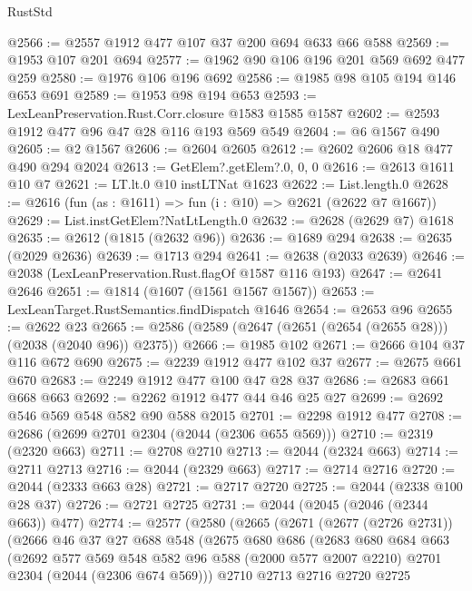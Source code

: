 \begin{lexlean}{RustStd}
\begin{coremodule}
{\begin{coremodule}
{{{{{{{{{{{{{{@2566 := @2557 @1912 @477 @107 @37 @200 @694 @633 @66 @588
@2569 := @1953 @107 @201 @694
@2577 := @1962 @90 @106 @196 @201 @569 @692 @477 @259
@2580 := @1976 @106 @196 @692
@2586 := @1985 @98 @105 @194 @146 @653 @691
@2589 := @1953 @98 @194 @653
@2593 := LexLeanPreservation.Rust.Corr.closure @1583 @1585 @1587
@2602 := @2593 @1912 @477 @96 @47 @28 @116 @193 @569 @549
@2604 := @6 @1567 @490
@2605 := @2 @1567
@2606 := @2604 @2605
@2612 := @2602 @2606 @18 @477 @490 @294 @2024
@2613 := GetElem?.getElem?.{0, 0, 0}
@2616 := @2613 @1611 @10 @7
@2621 := LT.lt.{0} @10 instLTNat @1623
@2622 := List.length.{0}
@2628 := @2616 (fun (as : @1611) => fun (i : @10) => @2621 (@2622 @7 @1667))
@2629 := List.instGetElem?NatLtLength.{0}
@2632 := @2628 (@2629 @7) @1618
@2635 := @2612 (@1815 (@2632 @96))
@2636 := @1689 @294
@2638 := @2635 (@2029 @2636)
@2639 := @1713 @294
@2641 := @2638 (@2033 @2639)
@2646 := @2038 (LexLeanPreservation.Rust.flagOf @1587 @116 @193)
@2647 := @2641 @2646
@2651 := @1814 (@1607 (@1561 @1567 @1567))
@2653 := LexLeanTarget.RustSemantics.findDispatch @1646
@2654 := @2653 @96
@2655 := @2622 @23
@2665 := @2586 (@2589 (@2647 (@2651 (@2654 (@2655 @28))) (@2038 (@2040 @96)) @2375))
@2666 := @1985 @102
@2671 := @2666 @104 @37 @116 @672 @690
@2675 := @2239 @1912 @477 @102 @37
@2677 := @2675 @661 @670
@2683 := @2249 @1912 @477 @100 @47 @28 @37
@2686 := @2683 @661 @668 @663
@2692 := @2262 @1912 @477 @44 @46 @25 @27
@2699 := @2692 @546 @569 @548 @582 @90 @588 @2015
@2701 := @2298 @1912 @477
@2708 := @2686 (@2699 @2701 @2304 (@2044 (@2306 @655 @569)))
@2710 := @2319 (@2320 @663)
@2711 := @2708 @2710
@2713 := @2044 (@2324 @663)
@2714 := @2711 @2713
@2716 := @2044 (@2329 @663)
@2717 := @2714 @2716
@2720 := @2044 (@2333 @663 @28)
@2721 := @2717 @2720
@2725 := @2044 (@2338 @100 @28 @37)
@2726 := @2721 @2725
@2731 := @2044 (@2045 (@2046 (@2344 @663)) @477)
@2774 := @2577
    (@2580
      (@2665
        (@2671
          (@2677 (@2726 @2731))
          (@2666
            @46
            @37
            @27
            @688
            @548
            (@2675
              @680
              @686
              (@2683
                @680
                @684
                @663
                (@2692
                  @577
                  @569
                  @548
                  @582
                  @96
                  @588
                  (@2000 @577 @2007 @2210)
                  @2701
                  @2304
                  (@2044 (@2306 @674 @569)))
                @2710
                @2713
                @2716
                @2720
                @2725
}}}}}}}}}}}}}}
\end{coremodule}}
\end{coremodule}
\end{lexlean}
